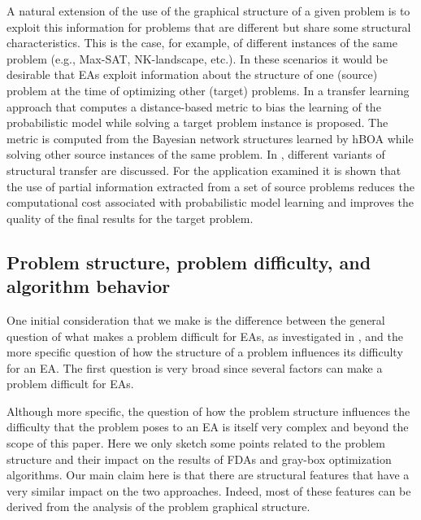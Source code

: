 \documentclass{article} %
\begin{document}
 A natural extension of the use of the graphical structure of a given problem is to exploit this information for problems that are different but share some structural characteristics. This is the case, for example, of different instances of the same problem (e.g., Max-SAT, NK-landscape, etc.). In these scenarios  it would be desirable that EAs exploit information about the structure of one (source) problem at the time of optimizing other (target) problems.  In \cite{Pelikan_and_Hauschild:2012} a transfer learning approach that computes a  distance-based metric to bias the learning of the probabilistic model while solving a target problem instance is proposed. The metric is computed  from the Bayesian network structures learned by hBOA while solving other source instances of the same problem. In  \cite{Santana_et_al:2012f}, different variants of structural transfer are discussed. For the application examined it is shown that the use of partial information extracted from a set of source problems reduces the computational cost associated with probabilistic model learning and improves the quality of the final results for the target problem.



\subsection{Problem structure, problem difficulty, and algorithm behavior}  \label{sec:GRAPH_DIFFICULTY}

 One initial consideration that we make is the difference between the general question of what makes  a problem difficult for EAs, as investigated in \cite{Forrest_and_Mitchell:1993,Manderick_et_al:1991,Mitchell_et_al:1992a,Thierens_et_al:1998}, and the more specific question of how the structure of a problem influences its  difficulty for an EA. The first question is very broad since several factors can make a problem difficult for EAs. 

  Although more specific, the question of how the problem structure  influences the difficulty that the problem poses to an EA is itself very complex and beyond the scope of this paper. Here we only sketch some points related to the problem structure and their impact on the results of FDAs and gray-box optimization algorithms. Our main claim here is that there are structural features that have a very similar impact on the two approaches. Indeed, most of these features can be derived from the analysis of the problem graphical structure. 
\end{document}
